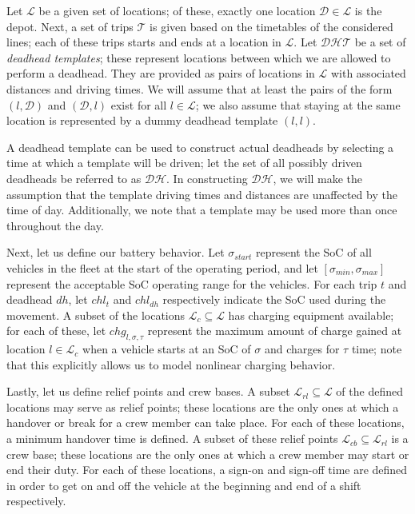 \documentclass[]{article}
\begin{document}
Let $\mathcal{L}$ be a given set of locations; of these, exactly one location $\mathcal{D} \in \mathcal{L}$ is the depot. Next, a set of trips $\mathcal{T}$ is given based on the timetables of the considered lines; each of these trips starts and ends at a location in $\mathcal{L}$. Let $\mathcal{DHT}$ be a set of \emph{deadhead templates}; these represent locations between which we are allowed to perform a deadhead. They are provided as pairs of locations in $\mathcal{L}$ with associated distances and driving times. We will assume that at least the pairs of the form $(l, \mathcal{D})$ and $(\mathcal{D}, l)$ exist for all $l \in \mathcal{L}$; we also assume that staying at the same location is represented by a dummy deadhead template $(l, l)$. 

A deadhead template can be used to construct actual deadheads by selecting a time at which a template will be driven; let the set of all possibly driven deadheads be referred to as $\mathcal{DH}$. In constructing $\mathcal{DH}$, we will make the assumption that the template driving times and distances are unaffected by the time of day. Additionally, we note that a template may be used more than once throughout the day. 

Next, let us define our battery behavior. Let $\sigma_{start}$ represent the SoC of all vehicles in the fleet at the start of the operating period, and let $[\sigma_{min}, \sigma_{max}]$ represent the acceptable SoC operating range for the vehicles. For each trip $t$ and deadhead $dh$, let $chl_t$ and $chl_{dh}$ respectively indicate the SoC used during the movement. A subset of the locations $\mathcal{L}_c \subseteq \mathcal{L}$ has charging equipment available; for each of these, let $chg_{l,\sigma,\tau}$ represent the maximum amount of charge gained at location $l \in \mathcal{L}_c$ when a vehicle starts at an SoC of $\sigma$ and charges for $\tau$ time; note that this explicitly allows us to model nonlinear charging behavior. 

Lastly, let us define relief points and crew bases. A subset $\mathcal{L}_{rl} \subseteq \mathcal{L}$ of the defined locations may serve as relief points; these locations are the only ones at which a handover or break for a crew member can take place. For each of these locations, a minimum handover time is defined. A subset of these relief points $\mathcal{L}_{cb} \subseteq \mathcal{L}_{rl}$ is a crew base; these locations are the only ones at which a crew member may start or end their duty. For each of these locations, a sign-on and sign-off time are defined in order to get on and off the vehicle at the beginning and end of a shift respectively. \newline
\end{document}

